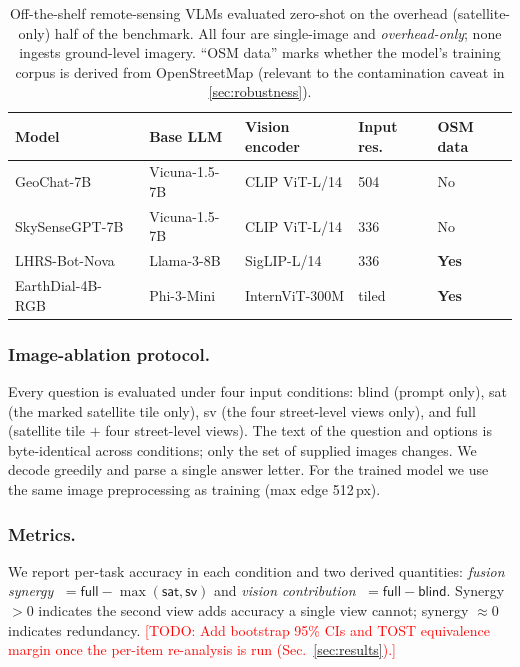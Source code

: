 \documentclass[runningheads]{llncs}
\newcommand{\todo}[1]{\textcolor{red}{[TODO: #1]}}
\begin{document}
\begin{table}[t]
  \centering
  \caption{Off-the-shelf remote-sensing VLMs evaluated zero-shot on the overhead
  (satellite-only) half of the benchmark. All four are single-image and
  \emph{overhead-only}; none ingests ground-level imagery. ``OSM data'' marks
  whether the model's training corpus is derived from OpenStreetMap (relevant to
  the contamination caveat in \cref{sec:robustness}).}
  \label{tab:models}
  \setlength{\tabcolsep}{4pt}
  \begin{tabular}{@{}lllll@{}}
    \toprule
    Model & Base LLM & Vision encoder & Input res. & OSM data \\
    \midrule
    GeoChat-7B~\cite{geochat2024}       & Vicuna-1.5-7B & CLIP ViT-L/14 & 504 & No \\
    SkySenseGPT-7B~\cite{skysensegpt2024} & Vicuna-1.5-7B & CLIP ViT-L/14 & 336 & No \\
    LHRS-Bot-Nova~\cite{lhrsbotnova2025}  & Llama-3-8B    & SigLIP-L/14   & 336 & \textbf{Yes} \\
    EarthDial-4B-RGB~\cite{earthdial2025} & Phi-3-Mini    & InternViT-300M & tiled & \textbf{Yes} \\
    \bottomrule
  \end{tabular}
\end{table}

\subsubsection{Image-ablation protocol.}
Every question is evaluated under four input conditions: \textsf{blind} (prompt
only), \textsf{sat} (the marked satellite tile only), \textsf{sv} (the four
street-level views only), and \textsf{full} (satellite tile $+$ four
street-level views). The text of the question and options is byte-identical
across conditions; only the set of supplied images changes. We decode greedily
and parse a single answer letter. For the trained model we use the same image
preprocessing as training (max edge \num{512}\,px).

\subsubsection{Metrics.}
We report per-task accuracy in each condition and two derived quantities:
\emph{fusion synergy} $\;=\textsf{full}-\max(\textsf{sat},\textsf{sv})$ and
\emph{vision contribution} $\;=\textsf{full}-\textsf{blind}$. Synergy
$>0$ indicates the second view adds accuracy a single view cannot; synergy
$\approx 0$ indicates redundancy. \todo{Add bootstrap \num{95}\% CIs and TOST
equivalence margin once the per-item re-analysis is run (Sec.~\ref{sec:results}).}
\end{document}
